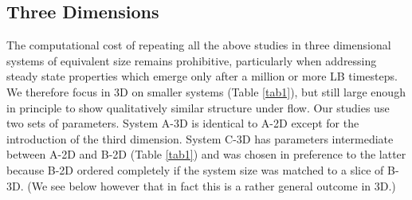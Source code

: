 \documentclass[8.5pt,twoside,twocolumn]{article}
\begin{document}
\subsection{Three Dimensions}
\label{results3D}

The computational cost of repeating all the above studies in three dimensional systems of equivalent size remains prohibitive, particularly when addressing steady state properties which emerge only after a million or more LB timesteps. We therefore focus in 3D on smaller systems (Table \ref{tab1}), but still large enough in principle to show qualitatively similar structure under flow. Our studies use two sets of parameters. System A-3D is identical to A-2D except for the introduction of the third dimension. System C-3D has parameters intermediate between A-2D and B-2D (Table \ref{tab1}) and was chosen in preference to the latter because B-2D ordered completely if the system size was matched to a slice of B-3D. (We see below however that in fact this is a rather general outcome in 3D.)
\end{document}
